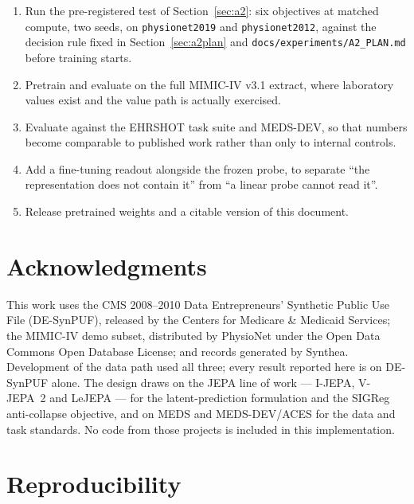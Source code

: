 \documentclass[11pt,a4paper]{article}
\newcommand{\code}[1]{\texttt{\small #1}}
\begin{document}
\begin{enumerate}[leftmargin=*,itemsep=2pt,topsep=3pt]
\item Run the pre-registered test of Section~\ref{sec:a2}: six objectives at
      matched compute, two seeds, on \code{physionet2019} and
      \code{physionet2012}, against the decision rule fixed in
      Section~\ref{sec:a2plan} and \code{docs/experiments/A2\_PLAN.md} before
      training starts.
\item Pretrain and evaluate on the full MIMIC-IV v3.1 extract, where laboratory
      values exist and the value path is actually exercised.
\item Evaluate against the EHRSHOT task suite and MEDS-DEV, so that numbers
      become comparable to published work rather than only to internal controls.
\item Add a fine-tuning readout alongside the frozen probe, to separate ``the
      representation does not contain it'' from ``a linear probe cannot read
      it''.
\item Release pretrained weights and a citable version of this document.
\end{enumerate}

\section*{Acknowledgments}

This work uses the CMS 2008--2010 Data Entrepreneurs' Synthetic Public Use File
(DE-SynPUF), released by the Centers for Medicare \& Medicaid Services; the
MIMIC-IV demo subset, distributed by PhysioNet under the Open Data Commons
Open Database License; and records generated by Synthea. Development of the
data path used all three; every result reported here is on DE-SynPUF alone. The
design draws on the JEPA line of work --- I-JEPA, V-JEPA~2 and LeJEPA --- for
the latent-prediction formulation and the SIGReg anti-collapse objective, and on
MEDS and MEDS-DEV/ACES for the data and task standards. No code from those
projects is included in this implementation.




\appendix
\section{Reproducibility}
\label{app:repro}
\end{document}
